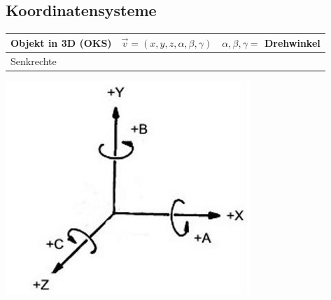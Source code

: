 \documentclass[8pt,a4paper,landscape]{scrartcl}
\begin{document}
\begin{multicols*}{3}
\subsection*{Koordinatensysteme}
\begin{tabularx}{\columnwidth}{l|X|c}
	Objekt in 3D (OKS) & $\vec{v} = (x,y,z,\alpha,\beta,\gamma)$ & $\alpha,\beta,\gamma = $ Drehwinkel \\ \hline
	Senkrechte &  \\ 
	
\end{tabularx}


\includegraphics[width=.25\columnwidth]{axis.png}


\end{multicols*}
\end{document}
